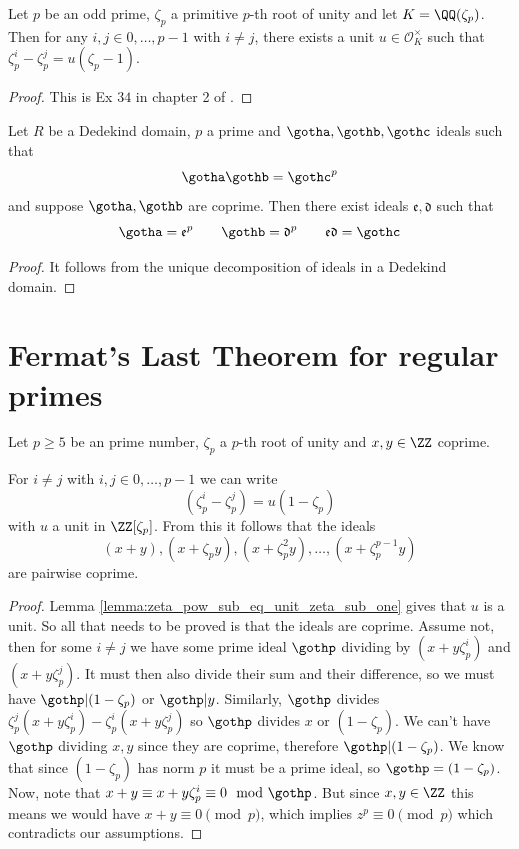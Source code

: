 \begin{lemma}\label{lemma:zeta_pow_sub_eq_unit_zeta_sub_one}
	\leanok
	Let $p$ be an odd prime, $\zeta_p$ a primitive $p$-th root of unity and let $K=\QQ(\zeta_p)$. Then for any $i,j \in {0,\dots,p-1}$ with $i \ne j$, there exists a unit $u \in \mathcal{O}_K^\times$ such that $\zeta_p^i-\zeta_p^j = u  (\zeta_p-1)$.
\end{lemma}
\begin{proof}
	\leanok
	This is Ex $34$ in chapter 2 of \cite{marcus}.
\end{proof}


\begin{lemma}\label{lemma:ideals_mult_to_power}
	\leanok
	Let $R$ be a Dedekind domain, $p$ a prime and $\gotha,\gothb,\gothc$ ideals such that \[\gotha\gothb=\gothc^p\] and suppose $\gotha,\gothb$ are coprime. Then there exist ideals $\mathfrak{e},\mathfrak{d}$ such that \[\gotha=\mathfrak{e}^p \qquad \gothb=\mathfrak{d}^p \qquad \mathfrak{e}\mathfrak{d}=\gothc\]
\end{lemma}
\begin{proof}
	\leanok
	It follows from the unique decomposition of ideals in a Dedekind domain.
\end{proof}


\section{Fermat's Last Theorem for regular primes}

\begin{lemma}\label{lem:flt_ideals_coprime}
	\leanok
	Let $p \geq 5$ be an prime number, $\zeta_p$ a $p$-th root of unity and $x, y \in \ZZ$ coprime.

	For $i \neq j$ with $i,j \in {0,\dots,p-1}$ we can write \[(\zeta_p^i-\zeta_p^j)=u(1-\zeta_p)\] with $u$ a unit in $\ZZ[\zeta_p]$. From this it follows that the ideals \[(x+y),(x+\zeta_py),(x+\zeta_p^2y),\dots,(x+\zeta_p^{p-1}y)\] are pairwise coprime.
\end{lemma}
\begin{proof}
	\leanok
	 Lemma \ref{lemma:zeta_pow_sub_eq_unit_zeta_sub_one} gives that $u$ is a unit. So all that needs to be proved is that the ideals are coprime. Assume not, then for some $i \neq j$ we have some prime ideal $\gothp$ dividing by $(x+y\zeta_p^i)$ and $(x+y\zeta_p^j)$. It must then also divide their sum and their difference, so we must have $\gothp | (1-\zeta_p)$ or $\gothp | y$. Similarly, $\gothp$ divides $\zeta_p^j(x+y\zeta_p^i)-\zeta_p^i(x+y\zeta_p^j)$ so $\gothp$ divides $x$ or $(1-\zeta_p)$. We can't have $\gothp$ dividing $x,y$ since they are coprime, therefore $\gothp |(1-\zeta_p)$. We know that since $(1-\zeta_p)$ has norm $p$ it must be a prime ideal, so $\gothp=(1-\zeta_p)$. Now, note that $x+y \equiv x+y\zeta_p^i \equiv 0 \mod \gothp$. But since $x,y \in \ZZ$ this means we would have $x+y \equiv 0 \pmod p$, which implies $z^p \equiv 0 \pmod p$ which contradicts our assumptions.
\end{proof}

